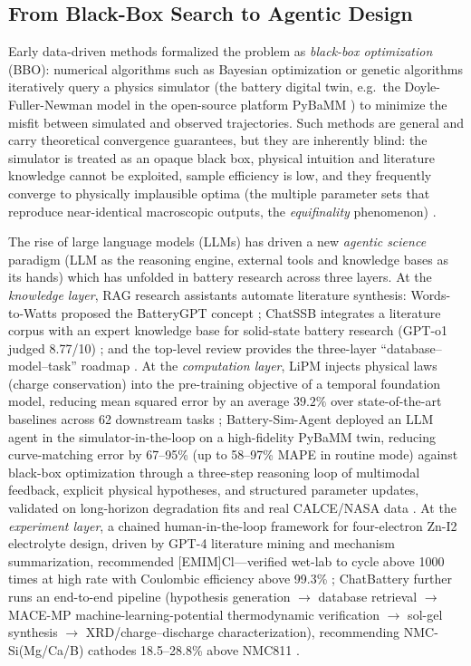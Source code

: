 \subsection{From Black-Box Search to Agentic Design}

Early data-driven methods formalized the problem as
\emph{black-box optimization} (BBO): numerical algorithms such as Bayesian
optimization \cite{jiang2022fastcharging} or genetic algorithms
\cite{zhang2014multiobjective} iteratively query a physics simulator (the
battery digital twin, e.g.\ the Doyle-Fuller-Newman model in the open-source
platform PyBaMM \cite{sulzer2021pybamm}) to minimize the misfit between
simulated and observed trajectories. Such methods are general and carry
theoretical convergence guarantees, but they are inherently blind: the
simulator is treated as an opaque black box, physical intuition and
literature knowledge cannot be exploited, sample efficiency is low, and
they frequently converge to physically implausible optima (the multiple
parameter sets that reproduce near-identical macroscopic outputs, the
\emph{equifinality} phenomenon) \cite{chen2026battery}.

The rise of large language models (LLMs) has driven a new
\emph{agentic science} paradigm (LLM as the reasoning engine, external
tools and knowledge bases as its hands) which has unfolded in battery
research across three layers. At the \emph{knowledge layer}, RAG research
assistants automate literature synthesis: Words-to-Watts proposed the
BatteryGPT concept \cite{words2watts2024}; ChatSSB integrates a literature
corpus with an expert knowledge base for solid-state battery research
(GPT-o1 judged 8.77/10) \cite{chatssb2025}; and the top-level review
provides the three-layer ``database--model--task'' roadmap
\cite{batteryLLMreview2025}. At the \emph{computation layer}, LiPM injects
physical laws (charge conservation) into the pre-training objective of a
temporal foundation model, reducing mean squared error by an average
$39.2\%$ over state-of-the-art baselines across 62 downstream tasks
\cite{lipm2025}; Battery-Sim-Agent
deployed an LLM agent in the simulator-in-the-loop on a high-fidelity
PyBaMM twin, reducing curve-matching error by 67--95\% (up to 58--97\%
MAPE in routine mode) against black-box optimization through a three-step
reasoning loop of multimodal feedback, explicit physical hypotheses, and
structured parameter updates, validated on long-horizon degradation fits
and real CALCE/NASA data \cite{chen2026battery}. At the \emph{experiment
layer}, a chained human-in-the-loop framework for four-electron Zn-I2
electrolyte design, driven by GPT-4 literature mining and mechanism
summarization, recommended [EMIM]Cl---verified wet-lab to cycle above 1000
times at high rate with Coulombic efficiency above 99.3\%
\cite{zni22026}; ChatBattery further runs an end-to-end pipeline
(hypothesis generation $\to$ database retrieval $\to$ MACE-MP
machine-learning-potential thermodynamic verification $\to$ sol-gel
synthesis $\to$ XRD/charge--discharge characterization), recommending
NMC-Si(Mg/Ca/B) cathodes 18.5--28.8\% above NMC811
\cite{chatbattery2025}.


